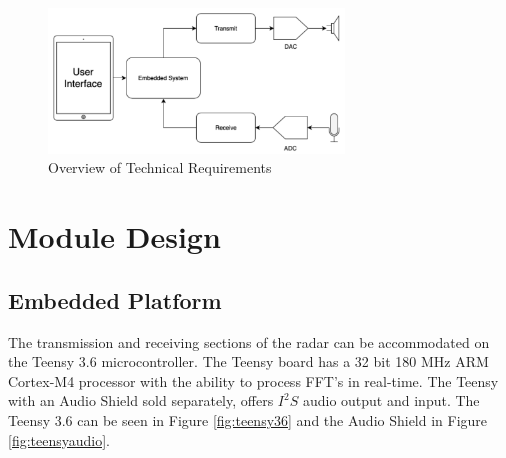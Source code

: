 \begin{figure}[h!]
    \centering
    \includegraphics[width = 0.7\textwidth]{images/overview.pdf}
    \caption{Overview of Technical Requirements}\label{pic:overview}
\end{figure}

\section{Module Design}
\subsection{Embedded Platform}
The transmission and receiving sections of the radar can be accommodated on the Teensy 3.6 microcontroller. The Teensy board has a 32 bit 180 MHz ARM Cortex-M4 processor with the ability to process FFT's in real-time. The Teensy with an Audio Shield sold separately, offers $I^2S$ audio output and input. The Teensy 3.6 can be seen in Figure \ref{fig:teensy36} and the Audio Shield in Figure \ref{fig:teensyaudio}. 

